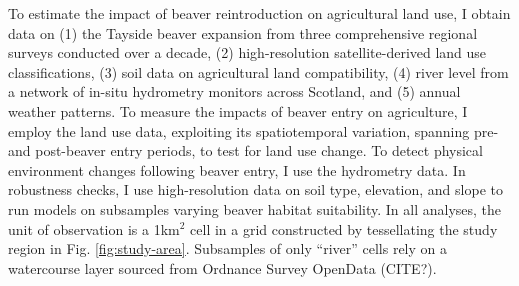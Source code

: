 To estimate the impact of beaver reintroduction on agricultural land use, I obtain data on (1) the Tayside beaver expansion from three comprehensive regional surveys conducted over a decade, (2) high-resolution satellite-derived land use classifications, (3) soil data on agricultural land compatibility, (4) river level from a network of in-situ hydrometry monitors across Scotland, and (5) annual weather patterns. To measure the impacts of beaver entry on agriculture, I employ the land use data, exploiting its spatiotemporal variation, spanning pre- and post-beaver entry periods, to test for land use change. To detect physical environment changes following beaver entry, I use the hydrometry data. In robustness checks, I use high-resolution data on soil type, elevation, and slope to run models on subsamples varying beaver habitat suitability. In all analyses, the unit of observation is a 1km$^2$ cell in a grid constructed by tessellating the study region in Fig. \ref{fig:study-area}. Subsamples of only ``river'' cells rely on a watercourse layer sourced from Ordnance Survey OpenData (CITE?).

